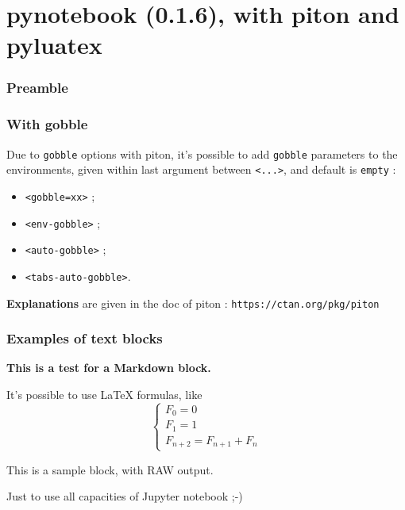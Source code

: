 \documentclass[a4paper,11pt]{article}
\def\PLver{0.1.6}
\begin{document}
\part*{pynotebook (\PLver), with piton and pyluatex}

\section{Preamble}


\section{With gobble}

Due to \texttt{gobble} options with \textsf{piton}, it's possible to add \texttt{gobble} parameters to the environments, given within last argument between \texttt{<...>}, and default is \texttt{empty} :

\begin{itemize}
	\item \texttt{<gobble=xx>} ;
	\item \texttt{<env-gobble>} ;
	\item \texttt{<auto-gobble>} ;
	\item \texttt{<tabs-auto-gobble>}.
\end{itemize}

\noindent{}\textbf{Explanations} are given in the doc of \textsf{piton} : \texttt{https://ctan.org/pkg/piton}

\section{Examples of text blocks}

\begin{codehigh}
\begin{NotebookPitonMarkdown}{\linewidth}
{\Large\bfseries This is a test for a \textsf{Markdown} block.}

It's possible to use \LaTeX{} formulas, like %
\[
  \left\lbrace\begin{array}{l}
    F_0 = 0\\
    F_1 = 1 \\
    F_{n+2} = F_{n+1} + F_n
  \end{array}\right.
\]
\end{NotebookPitonMarkdown}

\begin{NotebookPitonRaw}{\linewidth}
This is a sample block, with RAW output.

Just to use all capacities of Jupyter notebook ;-)
\end{NotebookPitonRaw}
\end{codehigh}
\end{document}
